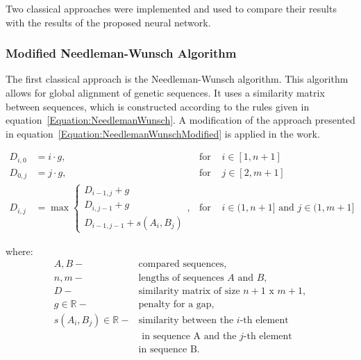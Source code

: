 \documentclass[biomedinformatics,article,submit,moreauthors]{Definitions/mdpi}
\begin{document}
        Two classical approaches were implemented and used to compare their results
        with the results of the proposed neural network.

            \subsubsection{Modified Needleman-Wunsch Algorithm}
                The first classical approach is the Needleman-Wunsch algorithm. This algorithm allows for global alignment of genetic sequences. It uses a similarity matrix between sequences, which is constructed according to the rules given in equation~\eqref{Equation:NeedlemanWunsch}. A modification of the approach presented in equation~\eqref{Equation:NeedlemanWunschModified} is applied in the work.

                \begin{equation}
                    \begin{aligned}
                        D_{i,0} &= i \cdot g, & \text{for } & i \in [1, n + 1] \\
                        D_{0,j} &= j \cdot g, & \text{for } & j \in [2, m + 1] \\
                        D_{i,j} &= \max
                        \begin{cases}
                            D_{i - 1, j} + g \\
                            D_{i, j - 1} + g \\
                            D_{i - 1, j - 1} + s(A_i, B_j)
                        \end{cases}, & \text{for } & i \in (1, n + 1] \text{ and } j \in (1, m + 1]
                    \end{aligned}
                    \label{Equation:NeedlemanWunsch}
                \end{equation}

                where:
                \begin{align*}
                    A, B -& \text{compared sequences}, \\
                    n, m -& \text{lengths of sequences } A \text{ and } B, \\
                    D -& \text{similarity matrix of size } n + 1 \text{ x } m + 1, \\
                    g \in \mathbb{R} -& \text{penalty for a gap}, \\
                    s(A_i, B_j) \in \mathbb{R} -& \text{similarity between the } i\text{-th element} \\
                                                & \text{ in sequence A and the } j\text{-th element} \\
                                                & \text{in sequence B}.
                \end{align*}
\end{document}
